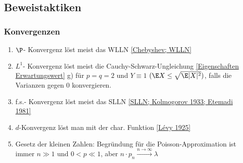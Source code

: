 \documentclass[11pt, a4paper]{article}
\begin{document}
\newpage

\subsection*{Beweistaktiken}
\subsubsection{Konvergenzen}
\begin{enumerate}
    \item $\P$- Konvergenz löst meist das WLLN \ref{Chebyshev; WLLN}
    \item $L^1$- Konvergenz löst meist die Cauchy-Schwarz-Ungleichung \ref{Eigenschaften Erwartungswert} g) für $p=q=2$ und $Y\equiv 1$ $(\E X\leq \sqrt{\E|X|^2})$, falls die Varianzen gegen 0 konvergieren.
    \item f.s.- Konvergenz löst meist das SLLN \ref{SLLN; Kolmogorov 1933; Etemadi 1981}
    \item $d$-Konvergenz löst man mit der char. Funktion \ref{Lévy 1925}
    \item Gesetz der kleinen Zahlen:  Begründung für die Poisson-Approximation ist immer $n\gg 1$ und $0<p\ll1$, aber $n\cdot p_n \xrightarrow{n\to \infty}\lambda $
\end{enumerate}
\PropertyNotice
\end{document}
